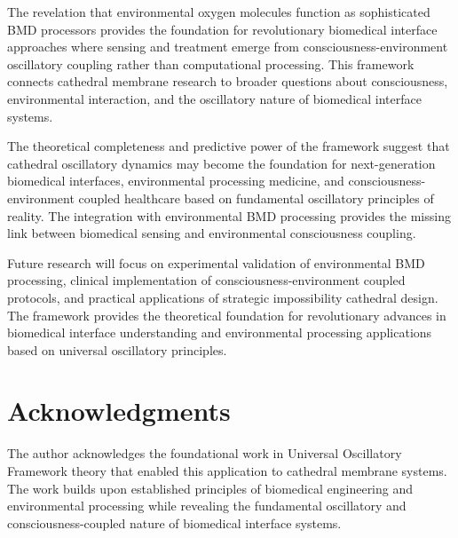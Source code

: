 \documentclass[12pt,a4paper]{article}
\begin{document}
The revelation that environmental oxygen molecules function as sophisticated BMD processors provides the foundation for revolutionary biomedical interface approaches where sensing and treatment emerge from consciousness-environment oscillatory coupling rather than computational processing. This framework connects cathedral membrane research to broader questions about consciousness, environmental interaction, and the oscillatory nature of biomedical interface systems.

The theoretical completeness and predictive power of the framework suggest that cathedral oscillatory dynamics may become the foundation for next-generation biomedical interfaces, environmental processing medicine, and consciousness-environment coupled healthcare based on fundamental oscillatory principles of reality. The integration with environmental BMD processing provides the missing link between biomedical sensing and environmental consciousness coupling.

Future research will focus on experimental validation of environmental BMD processing, clinical implementation of consciousness-environment coupled protocols, and practical applications of strategic impossibility cathedral design. The framework provides the theoretical foundation for revolutionary advances in biomedical interface understanding and environmental processing applications based on universal oscillatory principles.

\section{Acknowledgments}

The author acknowledges the foundational work in Universal Oscillatory Framework theory that enabled this application to cathedral membrane systems. The work builds upon established principles of biomedical engineering and environmental processing while revealing the fundamental oscillatory and consciousness-coupled nature of biomedical interface systems.
\end{document}
